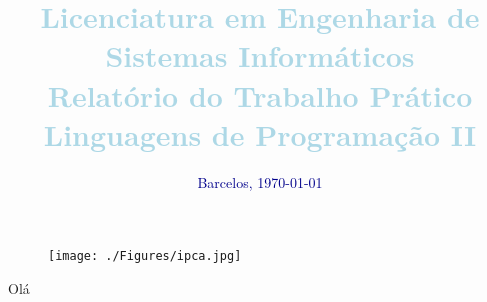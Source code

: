 \documentclass[a4paper, 12pt]{report}
\begin{document}
	
	
	\makeatletter
	\setlength{\@fptop}{0pt}
	\makeatother
		
	\begin{figure}[t!]
		\centering
		\texttt{[image: ./Figures/ipca.jpg]}
		\label{fig:ipca}
	\end{figure}
	Olá

\title{
	\textbf{\Large{\textcolor{lightBlue}{Licenciatura em Engenharia de Sistemas Informáticos}}}\\
	\bigskip
	\Large{\textcolor{lightBlue}{Relatório do Trabalho Prático}}\\
	\bigskip
	\textbf{\Huge{\textcolor{lightBlue}{Linguagens de Programação II}}}
}

\date{\textcolor{darkBlue}{Barcelos, \today}}
\end{document}
